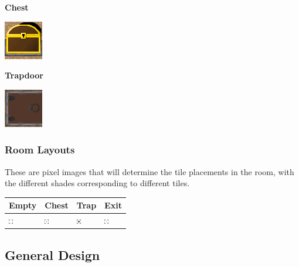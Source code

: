 \documentclass[../Main.tex]{subfiles}
\begin{document}
            \textbf{Chest} \newline
            \centerline{\includegraphics[scale=4]{../res/textures/tiles/Chest.png}}
            \textbf{Trapdoor} \newline
            \centerline{\includegraphics[scale=4]{../res/textures/tiles/Trapdoor.png}}

        \clearpage
        \subsubsection{Room Layouts}
            These are pixel images that will determine the tile placements in the room, with the different shades corresponding to different tiles.
            \begin{center}
                \begin{tabular}{ | m{} | m{} | m{} | m{} | }
                    \hline
                    \textbf{Empty} & \textbf{Chest} & \textbf{Trap} & \textbf{Exit} \\
                    \hline
                    \centerline{\includegraphics[scale=40]{../res/rooms/Empty.png}} & \centerline{\includegraphics[scale=40]{../res/rooms/Chest.png}} & \centerline{\includegraphics[scale=40]{../res/rooms/Trap.png}} & \centerline{\includegraphics[scale=40]{../res/rooms/Exit.png}}\\
                    \hline
                \end{tabular}
            \end{center}

    \subsection{General Design}
\end{document}
